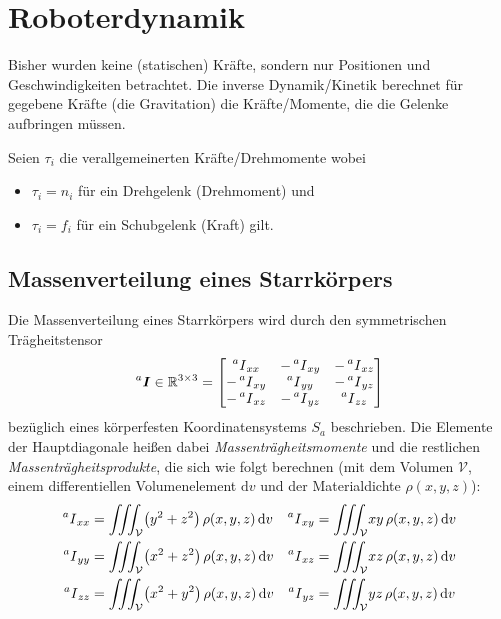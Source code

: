 \chapter{Roboterdynamik}
Bisher wurden keine (statischen) Kräfte, sondern nur Positionen und Geschwindigkeiten betrachtet. Die inverse Dynamik/Kinetik \INVDYN berechnet für gegebene Kräfte (\zB die Gravitation) die Kräfte/Momente, die die Gelenke aufbringen müssen.

Seien \( \tau_i \) die verallgemeinerten Kräfte/Drehmomente wobei
\begin{itemize}
	\item \( \tau_i = n_i \) für ein Drehgelenk (Drehmoment) und
	\item \( \tau_i = f_i \) für ein Schubgelenk (Kraft) gilt.
\end{itemize}

\section{Massenverteilung eines Starrkörpers}
Die Massenverteilung eines Starrkörpers wird durch den symmetrischen Trägheitstensor
\begin{equation*}
	\prescript{a}{}{\bm{I}} \in \mathbb{R}^{3 \times 3} =
	\begin{bmatrix}
		\prescript{a}{}{I}_{xx}  & -\prescript{a}{}{I}_{xy} & -\prescript{a}{}{I}_{xz} \\
		-\prescript{a}{}{I}_{xy} & \prescript{a}{}{I}_{yy}  & -\prescript{a}{}{I}_{yz} \\
		-\prescript{a}{}{I}_{xz} & -\prescript{a}{}{I}_{yz} & \prescript{a}{}{I}_{zz}
	\end{bmatrix}
\end{equation*}
bezüglich eines körperfesten Koordinatensystems \(S_a\) beschrieben. Die Elemente der Hauptdiagonale heißen dabei \emph{Massenträgheitsmomente} und die restlichen \emph{Massenträgheitsprodukte}, die sich wie folgt berechnen (mit dem Volumen \(\mathcal{V}\), einem differentiellen Volumenelement \( \text{d}v \) und der Materialdichte \( \rho(x, y, z) \)):
\begin{align*}
	\prescript{a}{}{I}_{xx} & = \iiint_{\mathcal{V}} \! \big(y^2 + z^2\big) \,\rho(x, y, z) \dd{v} & \prescript{a}{}{I}_{xy} & = \iiint_{\mathcal{V}} \! xy \,\rho(x, y, z) \dd{v} \\
	\prescript{a}{}{I}_{yy} & = \iiint_{\mathcal{V}} \! \big(x^2 + z^2\big) \,\rho(x, y, z) \dd{v} & \prescript{a}{}{I}_{xz} & = \iiint_{\mathcal{V}} \! xz \,\rho(x, y, z) \dd{v} \\
	\prescript{a}{}{I}_{zz} & = \iiint_{\mathcal{V}} \! \big(x^2 + y^2\big) \,\rho(x, y, z) \dd{v} & \prescript{a}{}{I}_{yz} & = \iiint_{\mathcal{V}} \! yz \,\rho(x, y, z) \dd{v}
\end{align*}

